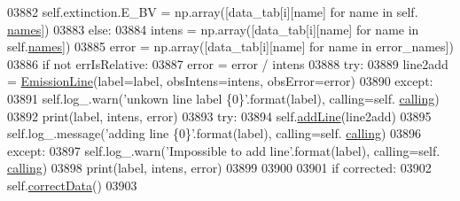 \begin{DoxyCode}
03882                     self.extinction.E\_BV = np.array([data\_tab[i][name] \textcolor{keywordflow}{for} name \textcolor{keywordflow}{in} self.
      \hyperlink{classpyneb_1_1core_1_1pynebcore_1_1_observation_a3f365d0b1488b2eba300bf71caf23c17}{names}])
03883                 \textcolor{keywordflow}{else}:
03884                     intens = np.array([data\_tab[i][name] \textcolor{keywordflow}{for} name \textcolor{keywordflow}{in} self.\hyperlink{classpyneb_1_1core_1_1pynebcore_1_1_observation_a3f365d0b1488b2eba300bf71caf23c17}{names}])
03885                     error = np.array([data\_tab[i][name] \textcolor{keywordflow}{for} name \textcolor{keywordflow}{in} error\_names])
03886                     \textcolor{keywordflow}{if} \textcolor{keywordflow}{not} errIsRelative:
03887                         error = error / intens
03888                     \textcolor{keywordflow}{try}:
03889                         line2add = \hyperlink{classpyneb_1_1core_1_1pynebcore_1_1_emission_line}{EmissionLine}(label=label, obsIntens=intens, obsError=error)
03890                     \textcolor{keywordflow}{except}:
03891                         self.log\_.warn(\textcolor{stringliteral}{'unkown line label \{0\}'}.format(label), calling=self.
      \hyperlink{classpyneb_1_1core_1_1pynebcore_1_1_observation_a2639fad9af4fefad20e4097295bd40e7}{calling})
03892                         print(label, intens, error)
03893                     \textcolor{keywordflow}{try}:
03894                         self.\hyperlink{classpyneb_1_1core_1_1pynebcore_1_1_observation_a17ddf1c03fd1859cafe36d0593ec5f01}{addLine}(line2add)
03895                         self.log\_.message(\textcolor{stringliteral}{'adding line \{0\}'}.format(label), calling=self.
      \hyperlink{classpyneb_1_1core_1_1pynebcore_1_1_observation_a2639fad9af4fefad20e4097295bd40e7}{calling})
03896                     \textcolor{keywordflow}{except}:
03897                         self.log\_.warn(\textcolor{stringliteral}{'Impossible to add line'}.format(label), calling=self.
      \hyperlink{classpyneb_1_1core_1_1pynebcore_1_1_observation_a2639fad9af4fefad20e4097295bd40e7}{calling})
03898                         print(label, intens, error)
03899         
03900             
03901         \textcolor{keywordflow}{if} corrected:
03902             self.\hyperlink{classpyneb_1_1core_1_1pynebcore_1_1_observation_a823a1fa51f042f2734cbc323c6a7d4bb}{correctData}()
03903             
            
\end{DoxyCode}
